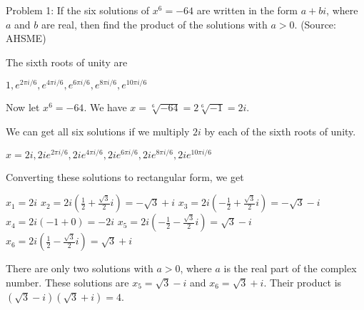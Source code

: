 Problem 1: If the six solutions of $x^6 = -64$ are written in the form $a + bi$, where $a$ and $b$ are real, then find the product of the solutions with $a > 0$. (Source: AHSME)

The sixth roots of unity are

$1, e^{2\pi i / 6}, e^{4 \pi i / 6}, e^{6 \pi i / 6}, e^{8 \pi i / 6}, e^{10 \pi i / 6}$

Now let $x^6 = -64$. We have $x = \sqrt[6]{-64} = 2\sqrt[6]{-1} = 2i$. 

We can get all six solutions if we multiply $2i$ by each of the sixth roots of unity.

$x = 2i, 2i e^{2\pi i / 6}, 2i e^{4 \pi i / 6}, 2i e^{6 \pi i / 6}, 2i e^{8 \pi i / 6}, 2i e^{10 \pi i / 6} $

Converting these solutions to rectangular form, we get

$ x_1 = 2i$
$ x_2 = 2i(\frac{1}{2} + \frac{\sqrt 3}{2}i) = -\sqrt{3} + i $
$ x_3 = 2i(-\frac{1}{2} + \frac{\sqrt 3}{2}i) = -\sqrt{3} - i $
$ x_4 = 2i(-1 + 0) = -2i $
$ x_5 = 2i(-\frac{1}{2} - \frac{\sqrt 3}{2}i) = \sqrt{3} - i $
$ x_6 = 2i(\frac{1}{2} - \frac{\sqrt 3}{2}i) = \sqrt{3} + i $

There are only two solutions with $a > 0$, where $a$ is the real part of the complex number. These solutions are $x_5 = \sqrt{3} - i$ and $x_6 = \sqrt{3} + i$. Their product is $\boxed{(\sqrt{3} - i)(\sqrt{3} + i) = 4}$.
